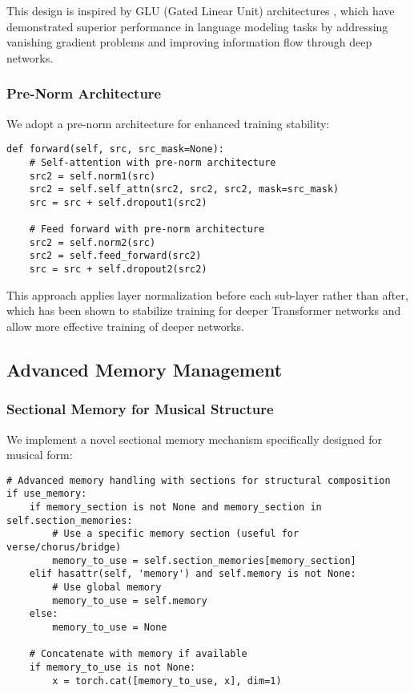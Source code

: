 \documentclass[12pt,a4paper]{article}
\begin{document}
This design is inspired by GLU (Gated Linear Unit) architectures \cite{dauphin2017language}, which have demonstrated superior performance in language modeling tasks by addressing vanishing gradient problems and improving information flow through deep networks.

\subsubsection{Pre-Norm Architecture}

We adopt a pre-norm architecture for enhanced training stability:

\begin{verbatim}
def forward(self, src, src_mask=None):
    # Self-attention with pre-norm architecture
    src2 = self.norm1(src)
    src2 = self.self_attn(src2, src2, src2, mask=src_mask)
    src = src + self.dropout1(src2)
    
    # Feed forward with pre-norm architecture
    src2 = self.norm2(src)
    src2 = self.feed_forward(src2)
    src = src + self.dropout2(src2)
\end{verbatim}

This approach applies layer normalization before each sub-layer rather than after, which has been shown to stabilize training for deeper Transformer networks \cite{wang2019learning} and allow more effective training of deeper networks.

\subsection{Advanced Memory Management}

\subsubsection{Sectional Memory for Musical Structure}

We implement a novel sectional memory mechanism specifically designed for musical form:

\begin{verbatim}
# Advanced memory handling with sections for structural composition
if use_memory:
    if memory_section is not None and memory_section in self.section_memories:
        # Use a specific memory section (useful for verse/chorus/bridge)
        memory_to_use = self.section_memories[memory_section]
    elif hasattr(self, 'memory') and self.memory is not None:
        # Use global memory
        memory_to_use = self.memory
    else:
        memory_to_use = None
        
    # Concatenate with memory if available
    if memory_to_use is not None:
        x = torch.cat([memory_to_use, x], dim=1)
\end{verbatim}
\end{document}
